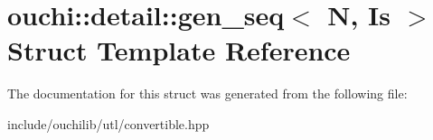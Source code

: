 \hypertarget{structouchi_1_1detail_1_1gen__seq}{}\section{ouchi\+::detail\+::gen\+\_\+seq$<$ N, Is $>$ Struct Template Reference}
\label{structouchi_1_1detail_1_1gen__seq}


The documentation for this struct was generated from the following file\+:\begin{DoxyCompactItemize}
\item 
include/ouchilib/utl/convertible.\+hpp\end{DoxyCompactItemize}
